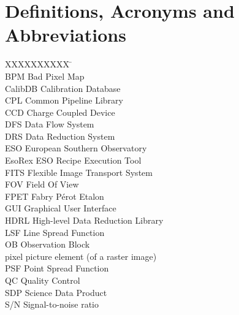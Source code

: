 \section{Definitions, Acronyms and Abbreviations}
\label{sec:acronyms}

\begin{tabbing}
XXXXXXXXXX \= \kill \\
BPM    \> Bad Pixel Map \\
CalibDB    \> Calibration Database \\
CPL        \> Common Pipeline Library \\
CCD        \> Charge Coupled Device \\
DFS        \> Data Flow System \\
DRS        \> Data Reduction System \\
ESO        \> European Southern Observatory \\
EsoRex     \> ESO Recipe Execution Tool \\
FITS       \> Flexible Image Transport System \\
FOV        \> Field Of View \\
FPET        \> Fabry Pérot Etalon \\
GUI        \> Graphical User Interface \\
HDRL        \> High-level Data Reduction Library \\
LSF        \> Line Spread Function \\
OB        \> Observation Block \\
pixel     \> picture element (of a raster image) \\
PSF       \> Point Spread Function \\
QC        \> Quality Control \\
SDP       \> Science Data Product \\
S/N       \> Signal-to-noise ratio \\

\end{tabbing}
